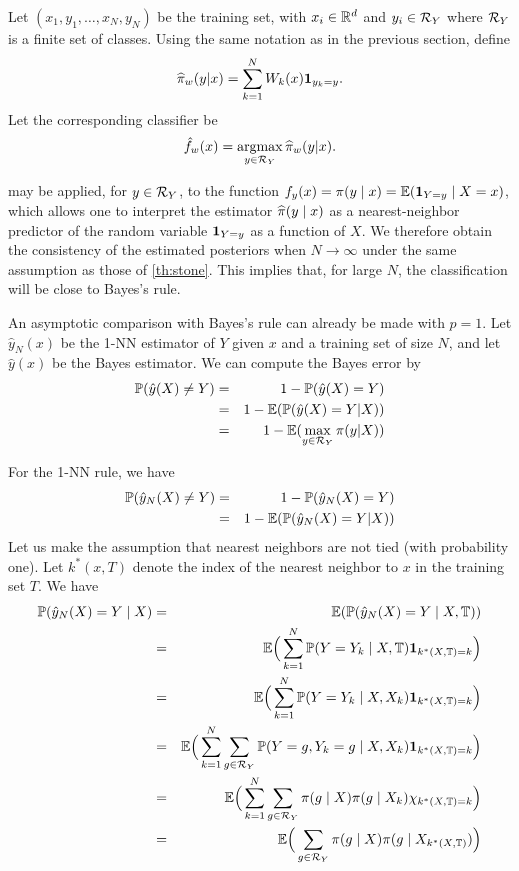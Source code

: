 Let $(x_1,
y_1, \ldots, x_N, y_N)$ be the training set, with $x_i\in{\mathbb{R}}^d$ and
$y_i\in {\mathcal R}_Y$ where ${\mathcal R}_Y$ is a finite set of classes. Using the same notation as in the previous section, define
\[
\widehat \pi_w(y|x) = \sum_{k=1}^N W_k(x) {\bm 1}_{y_k=y}.
\]
Let the corresponding classifier be 
\[
{\hat{f}}_w(x) = \operatorname*{argmax}_{y\in {\mathcal R}_Y} \widehat\pi_w(y|x).
\]

 may be applied, for $y\in {\mathcal R}_Y$, to
the function $f_y(x) = \pi(y\mid x) = \bm{\mathbb E}({\bm 1}_{Y=y} \mid X=x)$, which allows
one to interpret the estimator $\widehat\pi(y \mid x)$ as a nearest-neighbor
predictor of the random variable  ${\bm 1}_{Y=y}$ as a function of $X$. We therefore obtain
the consistency of the estimated posteriors when $N\to\infty$ under the same assumption as those of \cref{th:stone}.
 This implies that, for large $N$, the classification will
be close to Bayes's rule.

An asymptotic comparison with Bayes's rule can already be made  with
$p=1$. Let $\hat y_N(x)$ be the 1-NN  estimator of $Y$
given $x$ and a training set of size $N$, and let $\hat y(x)$ be the
Bayes estimator. We can compute the Bayes error by
\begin{eqnarray*}
\bm{\mathbb P}(\hat y(X) \neq Y) &=& 1 - \bm{\mathbb P}(\hat y(X) = Y)\\
&=& 1 - \bm{\mathbb E}(\bm{\mathbb P}(\hat y(X) = Y|X))\\
&=& 1 - \bm{\mathbb E}(\max_{y\in{\mathcal R}_Y} \pi(y|X))
\end{eqnarray*}

For the 1-NN rule, we have
\begin{eqnarray*}
\bm{\mathbb P}(\hat y_N(X) \neq Y) &=& 1 - \bm{\mathbb P}(\hat y_N(X) = Y)\\
&=& 1 - \bm{\mathbb E}(\bm{\mathbb P}(\hat y_N(X) = Y|X))\\
\end{eqnarray*}
Let us make the assumption that nearest neighbors are not tied (with probability one). Let $k^*(x, T)$ denote the index of  the nearest neighbor to $x$ in the training set $T$. We have
\begin{eqnarray*}
\bm{\mathbb P}(\hat y_N(X) = Y\mid X) & = & \bm{\mathbb E}(\bm{\mathbb P}(\hat y_N(X) = Y\mid X, {\mathbb T}))\\
& = & \bm{\mathbb E}\Big(\sum_{k=1}^N \bm{\mathbb P}( Y = Y_k\mid X, {\mathbb T}) {\bm 1}_{k^*(X, {\mathbb T}) = k}\Big)\\
& = & \bm{\mathbb E}\Big(\sum_{k=1}^N \bm{\mathbb P}( Y = Y_k \mid X, X_k) {\bm 1}_{k^*(X, {\mathbb T}) = k}\Big)\\
& = & \bm{\mathbb E}\Big(\sum_{k=1}^N \sum_{g\in {\mathcal R}_Y} \bm{\mathbb P}( Y = g,  Y_k=g\mid X, X_k) {\bm 1}_{k^*(X, {\mathbb T}) = k}\Big)\\
& = & \bm{\mathbb E}\Big(\sum_{k=1}^N \sum_{g\in {\mathcal R}_Y} \pi( g\mid X) \pi(g\mid X_k) \chi_{k^*(X, {\mathbb T}) = k}\Big)\\
& = & \bm{\mathbb E}\Big(\sum_{g\in {\mathcal R}_Y} \pi( g\mid X) \pi(g\mid  X_{k^*(X,{\mathbb T})}) \Big)
\end{eqnarray*}

